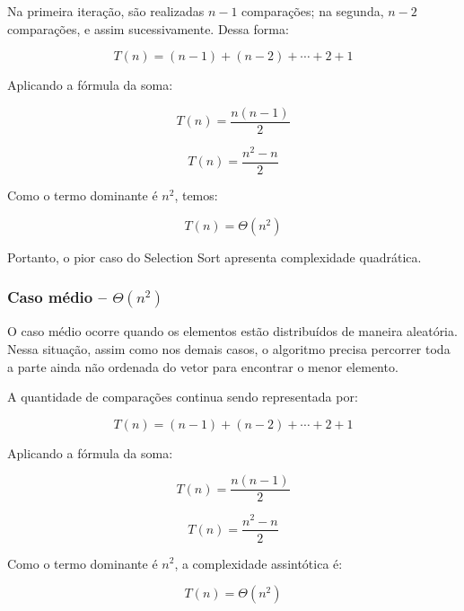 Na primeira iteração, são realizadas $n-1$ comparações; na segunda,
$n-2$ comparações, e assim sucessivamente. Dessa forma:

\begin{equation}
T(n) = (n-1) + (n-2) + \cdots + 2 + 1
\end{equation}

Aplicando a fórmula da soma:

\begin{equation}
T(n) = \frac{n(n-1)}{2}
\end{equation}

\begin{equation}
T(n) = \frac{n^2-n}{2}
\end{equation}

Como o termo dominante é $n^2$, temos:

\begin{equation}
T(n) = \Theta(n^2)
\end{equation}

Portanto, o pior caso do Selection Sort apresenta complexidade
quadrática.

\subsubsection{Caso médio -- $\Theta(n^2)$}

O caso médio ocorre quando os elementos estão distribuídos de maneira
aleatória. Nessa situação, assim como nos demais casos, o algoritmo
precisa percorrer toda a parte ainda não ordenada do vetor para encontrar
o menor elemento.

A quantidade de comparações continua sendo representada por:

\begin{equation}
T(n) = (n-1) + (n-2) + \cdots + 2 + 1
\end{equation}

Aplicando a fórmula da soma:

\begin{equation}
T(n) = \frac{n(n-1)}{2}
\end{equation}

\begin{equation}
T(n) = \frac{n^2-n}{2}
\end{equation}

Como o termo dominante é $n^2$, a complexidade assintótica é:

\begin{equation}
T(n) = \Theta(n^2)
\end{equation}

